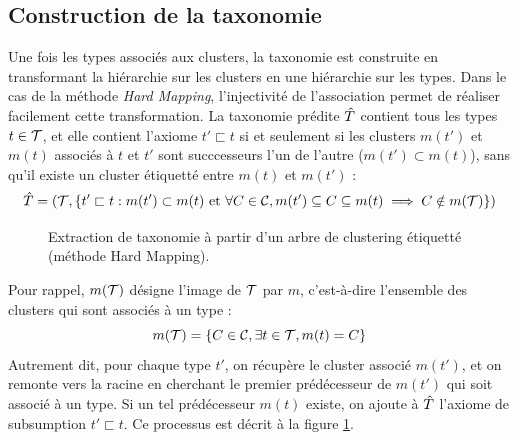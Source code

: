 \subsection{Construction de la taxonomie}
\label{subsec:te-taxconstruction}

Une fois les types associés aux clusters, la taxonomie est construite en transformant la hiérarchie sur les clusters en une hiérarchie sur les types. Dans le cas de la méthode \textit{Hard Mapping}, l'injectivité de l'association permet de réaliser facilement cette transformation. La taxonomie prédite $\Tpred$ contient tous les types $t \in \cal{T}$, et elle contient l'axiome $t' \sqsubset t$ si et seulement si les clusters $m(t')$ et $m(t)$ associés à $t$ et $t'$ sont succcesseurs l'un de l'autre ($m(t') \subset m(t)$), sans qu'il existe un cluster étiquetté entre $m(t)$ et $m(t')$ :
\begin{equation}
    \Tpred = (\cal{T}, \{t' \sqsubset t : m(t') \subset m(t) \text{ et } \forall C \in \cal{C},  m(t') \subseteq C \subseteq m(t) \implies C \notin m(\cal{T}) \})
    \label{eq:te-extract-tax-from-mapping}
\end{equation}

\begin{figure}[h]
    \centering
    
    \caption[Extraction de taxonomie selon la méthode Hard Mapping]{Extraction de taxonomie à partir d'un arbre de clustering étiquetté (méthode Hard Mapping).}
    \label{fig:te-hm-extraction}
\end{figure}


Pour rappel, $m(\cal{T})$ désigne l'image de $\cal{T}$ par $m$, c'est-à-dire l'ensemble des clusters qui sont associés à un type :
\begin{equation}
    m(\cal{T}) = \{ C \in \cal{C}, \exists t \in \cal{T}, m(t) = C \}
\end{equation}
Autrement dit, pour chaque type $t'$, on récupère le cluster associé $m(t')$, et on remonte vers la racine en cherchant le premier prédécesseur de $m(t')$ qui soit associé à un type. Si un tel prédécesseur $m(t)$ existe, on ajoute à $\Tpred$ l'axiome de subsumption $t' \sqsubset t$. Ce processus est décrit à la figure \ref{fig:te-hm-extraction}.



